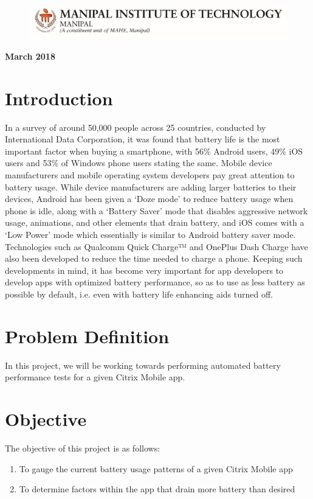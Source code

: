 \documentclass[a4paper,12pt]{article}
\begin{document}
\begin{titlepage}
\begin{center}
	\end{center}


	\begin{figure}[h]
  \begin{center}
	\includegraphics[scale=1]{MITLogo}
	\end{center}
	\end{figure}
	\begin{center}
	\textbf{March 2018}
	\end{center}
\end{titlepage}


\newpage
\section{Introduction}
In a survey of around 50,000 people across 25 countries, conducted by International Data Corporation, it was found that battery life is the most important factor when buying a smartphone, with 56\% Android users, 49\% iOS users and 53\% of Windows phone users stating the same.\cite{idcsurvey} Mobile device manufacturers and mobile operating system developers pay great attention to battery usage. While device manufacturers are adding larger batteries to their devices, Android has been given a ‘Doze mode’ to reduce battery usage when phone is idle, along with a ‘Battery Saver’ mode that disables aggressive network usage, animations, and other elements that drain battery, and iOS comes with a ‘Low Power’ mode which essentially is similar to Android battery saver mode. Technologies such as Qualcomm Quick Charge™ and OnePlus Dash Charge have also been developed to reduce the time needed to charge a phone. Keeping such developments in mind, it has become very important for app developers to develop apps with optimized battery performance, so as to use as less battery as possible by default, i.e. even with battery life enhancing aids turned off.
\section{Problem Definition}	
In this project, we will be working towards performing automated battery performance tests for a given Citrix Mobile app.
\section{Objective}
The objective of this project is as follows:
\begin{enumerate}
	\item To gauge the current battery usage patterns of a given Citrix Mobile app
	\item To determine factors within the app that drain more battery than desired
\end{enumerate}
\end{document}
